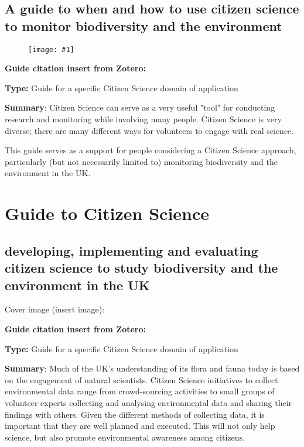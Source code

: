 \documentclass{article}
\newlength{\imgwidth}
\newcommand\scaledgraphics[2]{%
                
\settowidth{\imgwidth}{\texttt{[image: \#1]}}%
                
\setlength{\imgwidth}{\minof{\imgwidth}{#2\textwidth}}%
                
\texttt{[image: \#1]}%
                
}
\begin{document}
\subsection{A guide to when and how to use citizen science to monitor biodiversity and the environment}\label{H8816796}


\begin{figure}
\scaledgraphics{dba5d5eb-235c-4694-a2d4-c26b6e16182b.png}{0.5}
\label{F60064251}
\end{figure}


\textbf{Guide citation insert from Zotero:} \autocite{pocock_choosing_2014}


\textbf{Type: }Guide for a specific Citizen Science domain of application


\textbf{Summary}: Citizen Science can serve as a very useful "tool" for conducting research and monitoring while involving many people. Citizen Science is very diverse; there are many different ways for volunteers to engage with real science.


This guide serves as a support for people considering a Citizen Science approach, particularly (but not necessarily limited to) monitoring biodiversity and the environment in the UK.


\section{Guide to Citizen Science}\label{H3514415}



\subsection{developing, implementing and evaluating citizen science to study biodiversity and the environment in the UK}\label{H903150}



Cover image (insert image):


\textbf{Guide citation insert from Zotero:} \autocite{tweddle_guide_2012}


\textbf{Type: }Guide for a specific Citizen Science domain of application


\textbf{Summary}: Much of the UK's understanding of its flora and fauna today is based on the engagement of natural scientists. Citizen Science initiatives to collect environmental data range from crowd-sourcing activities to small groups of volunteer experts collecting and analysing environmental data and sharing their findings with others. Given the different methods of collecting data, it is important that they are well planned and executed. This will not only help science, but also promote environmental awareness among citizens.
\end{document}
